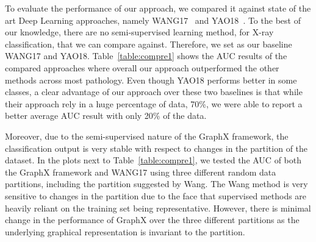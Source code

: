 \documentclass[runningheads]{llncs}
\begin{document}
To evaluate the performance of our approach, we compared it against state of the art Deep Learning approaches, namely WANG17~\cite{wang2017chestx} and YAO18~\cite{yao2018weakly}. To the best of our knowledge, there are no semi-supervised learning method, for X-ray classification, that we can compare against. Therefore, we set as our baseline WANG17 and YAO18.
Table~\ref{table:compre1} shows the AUC results of the compared approaches where overall our approach outperformed the other methods across most pathology. Even though YAO18 performs better in some classes, a clear advantage of our approach over these two baselines is that while their approach rely in a huge percentage of data, 70\%, we were able to report a better average AUC result with only 20\% of the data.

Moreover, due to the semi-supervised nature of the GraphX framework, the classification output is very stable with respect to changes in the partition of the dataset. In the plots next to Table~\ref{table:compre1}, we tested the AUC of both the GraphX framework and WANG17 \cite{wang2017chestx} using three different random data partitions, including the partition suggested by Wang. The Wang method is very sensitive to changes in the partition due to the face that supervised methods are heavily reliant on the training set being representative. However, there is minimal change in the performance of GraphX over the three different partitions as the underlying graphical representation is invariant to the partition.
\end{document}

